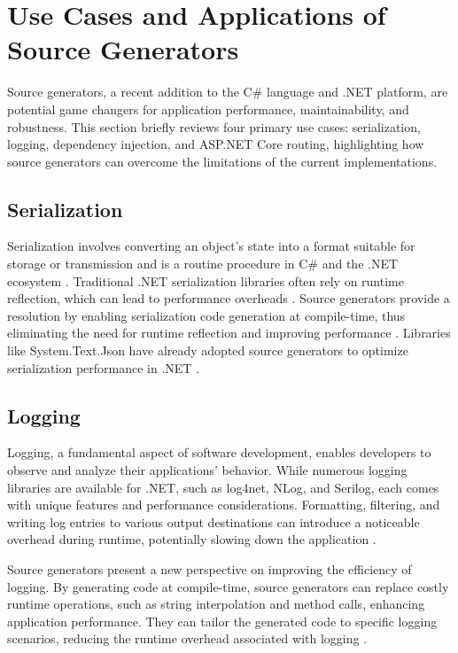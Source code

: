 \section{Use Cases and Applications of Source Generators}

Source generators, a recent addition to the C\# language and .NET platform, are potential game changers for application performance, maintainability, and robustness. This section briefly reviews four primary use cases: serialization, logging, dependency injection, and ASP.NET Core routing, highlighting how source generators can overcome the limitations of the current implementations.

\subsection{Serialization}

Serialization involves converting an object's state into a format suitable for storage or transmission and is a routine procedure in C\# and the .NET ecosystem \cite{Fowler2002}. Traditional .NET serialization libraries often rely on runtime reflection, which can lead to performance overheads \cite{NewtonsoftJsonPerformance, Tudose2013}. Source generators provide a resolution by enabling serialization code generation at compile-time, thus eliminating the need for runtime reflection and improving performance \cite{CSharpRoslyn}. Libraries like System.Text.Json have already adopted source generators to optimize serialization performance in .NET \cite{SystemTextJson, SystemTextJsonSourceGen}.

\subsection{Logging}

Logging, a fundamental aspect of software development, enables developers to observe and analyze their applications' behavior. While numerous logging libraries are available for .NET, such as log4net, NLog, and Serilog, each comes with unique features and performance considerations. Formatting, filtering, and writing log entries to various output destinations can introduce a noticeable overhead during runtime, potentially slowing down the application \cite{Serilog, Fowler2002}.

Source generators present a new perspective on improving the efficiency of logging. By generating code at compile-time, source generators can replace costly runtime operations, such as string interpolation and method calls, enhancing application performance. They can tailor the generated code to specific logging scenarios, reducing the runtime overhead associated with logging \cite{Carter2020, Fowler2002}.

